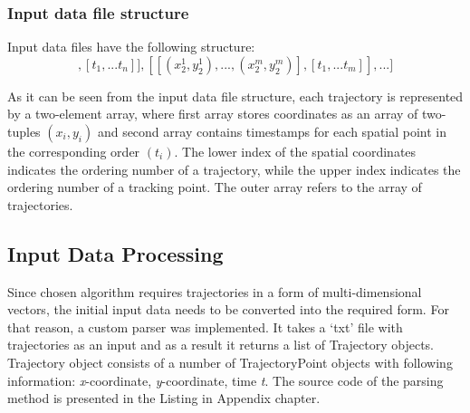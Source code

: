 \subsubsection{Input data file structure}
Input data files have the following structure:
\begin{equation}
	[[[(x_1^1, y_1^1), ..., (x_1^n, y_1^n)], [t_1, ... t_n]], [[(x_2^1, y_2^1), ..., (x_2^m, y_2^m)], [t_1, ... t_m]], ...]
\end{equation}

As it can be seen from the input data file structure, each trajectory is represented by a two-element array, where first array stores coordinates as an array of two-tuples $(x_i, y_i)$ and second array contains timestamps for each spatial point in the corresponding order $(t_i)$. The lower index of the spatial coordinates indicates the ordering number of a trajectory, while the upper index indicates the ordering number of a tracking point. The outer array refers to the array of trajectories.


\subsection{Input Data Processing}
Since chosen algorithm requires trajectories in a form of multi-dimensional vectors, the initial input data needs to be converted into the required form. For that reason, a custom parser was implemented. It takes a ‘txt’ file with trajectories as an input and as a result it returns a list of Trajectory objects. Trajectory object consists of a number of TrajectoryPoint objects with following information: \textit{x}-coordinate, \textit{y}-coordinate, time \textit{t}. The source code of the parsing method is presented in the Listing in Appendix chapter.